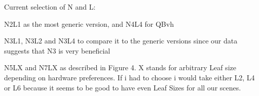 \newpage

Current selection of N and L:

N2L1 as the most generic version, and N4L4 for QBvh

N3L1, N3L2 and N3L4 to compare it to the generic versions since our data suggests that N3 is very beneficial

N5LX and N7LX as described in Figure 4. X stands for arbitrary Leaf size depending on hardware preferences. If i had to choose i would take either L2, L4 or L6 because it seems to be good to have even Leaf Sizes for all our scenes.